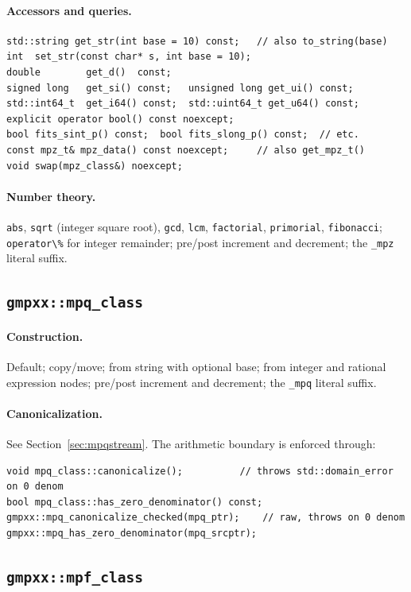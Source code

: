 \documentclass[11pt,a4paper]{article}
\newcommand{\code}[1]{\lstinline!#1!}
\begin{document}
\paragraph{Accessors and queries.}
\begin{lstlisting}
std::string get_str(int base = 10) const;   // also to_string(base)
int  set_str(const char* s, int base = 10);
double        get_d()  const;
signed long   get_si() const;   unsigned long get_ui() const;
std::int64_t  get_i64() const;  std::uint64_t get_u64() const;
explicit operator bool() const noexcept;
bool fits_sint_p() const;  bool fits_slong_p() const;  // etc.
const mpz_t& mpz_data() const noexcept;     // also get_mpz_t()
void swap(mpz_class&) noexcept;
\end{lstlisting}

\paragraph{Number theory.}
\code{abs}, \code{sqrt} (integer square root), \code{gcd}, \code{lcm},
\code{factorial}, \code{primorial}, \code{fibonacci}; \code{operator\%} for
integer remainder; pre/post increment and decrement; the \code{_mpz} literal
suffix.

\subsection{\code{gmpxx::mpq_class}}

\paragraph{Construction.} Default; copy/move; from string with optional base;
from integer and rational expression nodes; pre/post increment and decrement;
the \code{_mpq} literal suffix.

\paragraph{Canonicalization.} See Section~\ref{sec:mpqstream}. The arithmetic
boundary is enforced through:
\begin{lstlisting}
void mpq_class::canonicalize();          // throws std::domain_error on 0 denom
bool mpq_class::has_zero_denominator() const;
gmpxx::mpq_canonicalize_checked(mpq_ptr);    // raw, throws on 0 denom
gmpxx::mpq_has_zero_denominator(mpq_srcptr);
\end{lstlisting}

\subsection{\code{gmpxx::mpf_class}}
\end{document}
